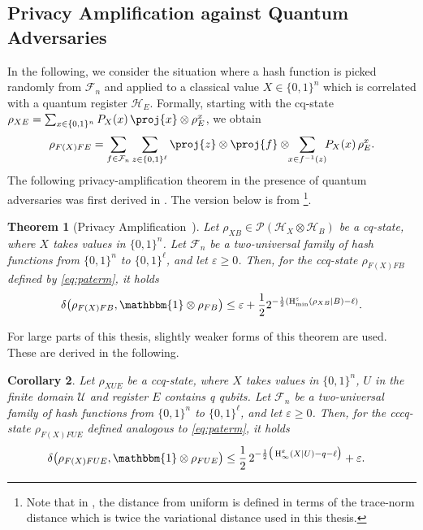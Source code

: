 \documentclass[final,11pt,a4paper]{report}
\newtheorem{theorem}{Theorem}[chapter]
\newtheorem{corollary}[theorem]{Corollary}
\newcommand*{\cH}{\mathcal{H}}
\newcommand*{\cU}{\mathcal{U}}
\newcommand*{\nbit}{\set{0,1}^n}
\newcommand*{\set}[1]{\{#1\}}          %
\renewcommand*{\I}{\mathbbm{1}}
\newcommand*{\dens}[1]{\mathcal{P}(#1)}  %
\renewcommand*{\H}{\operatorname{H}}   %
\newcommand*{\qhmin}{\ensuremath{\H_{\rm min}}}  %
\newcommand*{\hminee}{\qhmin^{\varepsilon}} %
\newcommand*{\dist}[1]{\delta\big(#1\big)}  %
\newcommand*{\eps}{\varepsilon}
\newcommand*{\chf}[1]{\ensuremath{\mathcal{F}_{#1}}} %
\begin{document}
\subsection{Privacy Amplification against Quantum Adversaries}
In the following, we consider the situation where a hash function
is picked randomly from $\chf{n}$ and applied to a classical value $X
\in \nbit$ which is correlated with a quantum register
$\cH_E$. Formally, starting with the cq-state $\rho_{XE} = \sum_{x \in
  \nbit} P_X(x) \, \proj{x} \otimes \rho_E^x$, we obtain
\begin{equation}  \label{eq:paterm}
\rho_{F(X) F E} = \sum_{f \in \chf{n}} \sum_{z \in
  \set{0,1}^{\ell}} \proj{z} \otimes \proj{f} \otimes \!\! \sum_{x \in
  f^{-1}(z)} \!\! P_X(x)  \, \rho_E^x.
\end{equation}
The following privacy-amplification theorem in the
presence of quantum adversaries was first derived in \cite{RK05}. The
version below is from \cite[Corollary 5.6.1]{Renner05}\footnote{Note
  that in \cite{Renner05}, the distance from uniform is defined in
  terms of the trace-norm distance which is twice the variational
  distance used in this thesis.}.
\begin{theorem}[Privacy Amplification~\cite{Renner05}]\label{thm:paoriginal}
  Let $\rho_{XB} \in \dens{\cH_X \otimes \cH_B}$ be a cq-state, where
  $X$ takes values in $\nbit$. Let $\chf{n}$ be a two-universal family
  of hash functions from $\nbit$ to $\set{0,1}^{\ell}$, and let $\eps
  \geq 0$. Then, for the ccq-state $\rho_{F(X) FB}$ defined by
  \eqref{eq:paterm}, it holds
\[ \dist{ \rho_{F(X) FB} , \I \otimes \rho_{FB} } \leq \eps + \frac12
2^{-\frac12 (\hminee(\rho_{XB} | B) - \ell)}.
\]
\end{theorem}

For large parts of this thesis, slightly weaker forms of this theorem
are used. These are derived in the following.
\begin{corollary} \label{thm:pasmooth}
  Let $\rho_{XUE}$ be a ccq-state, where $X$ takes values in $\nbit$, 
  $U$ in the finite domain $\cU$ and register $E$ contains q qubits.
  Let $\chf{n}$ be a two-universal family of hash functions from
  $\nbit$ to $\set{0,1}^{\ell}$, and let $\eps \geq 0$. Then, for the
  cccq-state $\rho_{F(X) FUE}$ defined analogous to \eqref{eq:paterm}, it holds
\begin{align}
  \dist{ \rho_{F(X)FUE} , \I \otimes \rho_{F U E} } &\leq \frac{1}{2} \,
  2^{-\frac{1}{2}\big(\H_{\infty}^{\varepsilon}
(X | U)-q-\ell\big)} + \varepsilon. \label{dbound}
\end{align}
\end{corollary}
\end{document}
